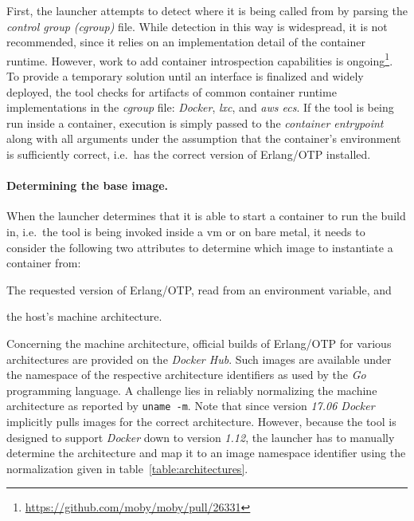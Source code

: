 First, the launcher  attempts to detect where it is being called from by parsing the \emph{control group (cgroup)} file. While detection in this way is widespread, it is not recommended, since it relies on an implementation detail of the container runtime. However, work to add container introspection capabilities is ongoing\footnote{\url{https://github.com/moby/moby/pull/26331}}. To provide a temporary solution until an interface is finalized and widely deployed, the tool checks for artifacts of common container runtime implementations in the \emph{cgroup} file: \emph{Docker}, \emph{\acrfull{lxc}}, and \emph{\acrfull{aws} \acrfull{ecs}}. If the tool is being run inside a container, execution is simply passed to the \emph{container entrypoint} along with all arguments under the assumption that the container's environment is sufficiently correct, i.e.~has the correct version of Erlang/OTP installed.

\paragraph{Determining the base image.} When the launcher determines that it is able to start a container to run the build in, i.e.~the tool is being invoked inside a \acrshort{vm} or on bare metal, it needs to consider the following two attributes to determine which image to instantiate a container from:
\begin{enumerate*}[label=(\roman*)]
  \item The requested version of Erlang/OTP, read from an environment variable, and
  \item the host's machine architecture.
\end{enumerate*}

Concerning the machine architecture, official builds of Erlang/OTP for various architectures are provided on the \emph{Docker Hub}. Such images are available under the namespace of the respective architecture identifiers as used by the \emph{Go} programming language. A challenge lies in reliably normalizing the machine architecture as reported by \lstinline|uname -m|. Note that since version \emph{17.06 Docker} implicitly pulls images for the correct architecture. However, because the tool is designed to support \emph{Docker} down to version \emph{1.12}, the launcher has to manually determine the architecture and map it to an image namespace identifier using the normalization given in table~\ref{table:architectures}.

